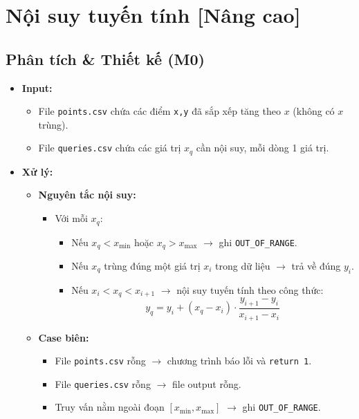 \section{Nội suy tuyến tính [Nâng cao]}

\subsection{Phân tích \& Thiết kế (M0)}
\begin{itemize}
    \item \textbf{Input:}
    \begin{itemize}
        \item File \texttt{points.csv} chứa các điểm \texttt{x,y} đã sắp xếp tăng theo $x$ (không có $x$ trùng).
        \item File \texttt{queries.csv} chứa các giá trị $x_q$ cần nội suy, mỗi dòng 1 giá trị.
    \end{itemize}

    \item \textbf{Xử lý:}
    \begin{itemize}
        \item \textbf{Nguyên tắc nội suy:}
        \begin{itemize}
            \item Với mỗi $x_q$:
            \begin{itemize}
                \item Nếu $x_q < x_{\min}$ hoặc $x_q > x_{\max}$ $\rightarrow$ ghi \texttt{OUT\_OF\_RANGE}.
                \item Nếu $x_q$ trùng đúng một giá trị $x_i$ trong dữ liệu $\rightarrow$ trả về đúng $y_i$.
                \item Nếu $x_i < x_q < x_{i+1}$ $\rightarrow$ nội suy tuyến tính theo công thức:
                \[
                y_q = y_i + (x_q - x_i)\cdot \frac{y_{i+1} - y_i}{x_{i+1} - x_i}
                \]
            \end{itemize}
        \end{itemize}

        \item \textbf{Case biên:}
        \begin{itemize}
            \item File \texttt{points.csv} rỗng $\rightarrow$ chương trình báo lỗi và \texttt{return 1}.
            \item File \texttt{queries.csv} rỗng $\rightarrow$ file output rỗng.
            \item Truy vấn nằm ngoài đoạn $[x_{\min}, x_{\max}]$ $\rightarrow$ ghi \texttt{OUT\_OF\_RANGE}.
        \end{itemize}


\end{itemize}
\end{itemize}
